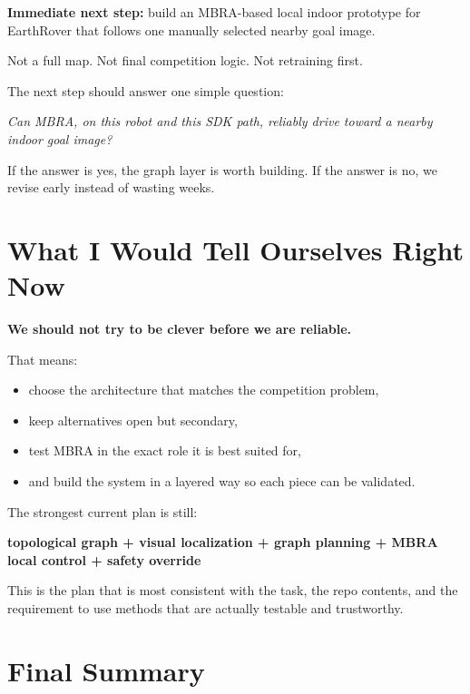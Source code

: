\documentclass[11pt,a4paper]{article}
\begin{document}
\begin{mdframed}
\textbf{Immediate next step:} build an MBRA-based local indoor prototype for
EarthRover that follows one manually selected nearby goal image.
\end{mdframed}

Not a full map. Not final competition logic. Not retraining first.

The next step should answer one simple question:
\begin{center}
\textit{Can MBRA, on this robot and this SDK path, reliably drive toward a nearby indoor goal image?}
\end{center}

If the answer is yes, the graph layer is worth building. If the answer is no,
we revise early instead of wasting weeks.


\section{What I Would Tell Ourselves Right Now}

\begin{mdframed}
\textbf{We should not try to be clever before we are reliable.}
\end{mdframed}

That means:
\begin{itemize}[nosep]
  \item choose the architecture that matches the competition problem,
  \item keep alternatives open but secondary,
  \item test MBRA in the exact role it is best suited for,
  \item and build the system in a layered way so each piece can be validated.
\end{itemize}

The strongest current plan is still:
\begin{center}
\textbf{topological graph + visual localization + graph planning + MBRA local control + safety override}
\end{center}

This is the plan that is most consistent with the task, the repo contents, and
the requirement to use methods that are actually testable and trustworthy.


\section{Final Summary}
\end{document}
